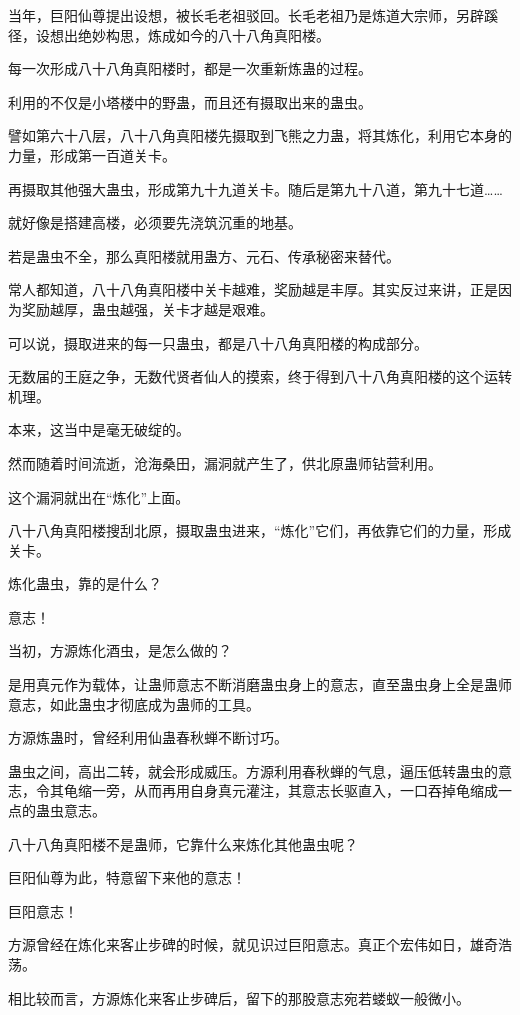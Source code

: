 \begin{this_body}
当年，巨阳仙尊提出设想，被长毛老祖驳回。长毛老祖乃是炼道大宗师，另辟蹊径，设想出绝妙构思，炼成如今的八十八角真阳楼。

每一次形成八十八角真阳楼时，都是一次重新炼蛊的过程。

利用的不仅是小塔楼中的野蛊，而且还有摄取出来的蛊虫。

譬如第六十八层，八十八角真阳楼先摄取到飞熊之力蛊，将其炼化，利用它本身的力量，形成第一百道关卡。

再摄取其他强大蛊虫，形成第九十九道关卡。随后是第九十八道，第九十七道……

就好像是搭建高楼，必须要先浇筑沉重的地基。

若是蛊虫不全，那么真阳楼就用蛊方、元石、传承秘密来替代。

常人都知道，八十八角真阳楼中关卡越难，奖励越是丰厚。其实反过来讲，正是因为奖励越厚，蛊虫越强，关卡才越是艰难。

可以说，摄取进来的每一只蛊虫，都是八十八角真阳楼的构成部分。

无数届的王庭之争，无数代贤者仙人的摸索，终于得到八十八角真阳楼的这个运转机理。

本来，这当中是毫无破绽的。

然而随着时间流逝，沧海桑田，漏洞就产生了，供北原蛊师钻营利用。

这个漏洞就出在“炼化”上面。

八十八角真阳楼搜刮北原，摄取蛊虫进来，“炼化”它们，再依靠它们的力量，形成关卡。

炼化蛊虫，靠的是什么？

意志！

当初，方源炼化酒虫，是怎么做的？

是用真元作为载体，让蛊师意志不断消磨蛊虫身上的意志，直至蛊虫身上全是蛊师意志，如此蛊虫才彻底成为蛊师的工具。

方源炼蛊时，曾经利用仙蛊春秋蝉不断讨巧。

蛊虫之间，高出二转，就会形成威压。方源利用春秋蝉的气息，逼压低转蛊虫的意志，令其龟缩一旁，从而再用自身真元灌注，其意志长驱直入，一口吞掉龟缩成一点的蛊虫意志。

八十八角真阳楼不是蛊师，它靠什么来炼化其他蛊虫呢？

巨阳仙尊为此，特意留下来他的意志！

巨阳意志！

方源曾经在炼化来客止步碑的时候，就见识过巨阳意志。真正个宏伟如日，雄奇浩荡。

相比较而言，方源炼化来客止步碑后，留下的那股意志宛若蝼蚁一般微小。


\end{this_body}

